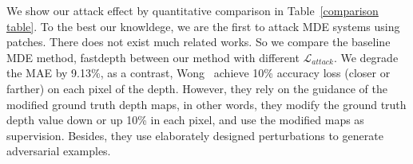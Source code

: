 \documentclass[10pt,twocolumn,letterpaper]{article}
\begin{document}
We show our attack effect by quantitative comparison in 
Table~\ref{comparison table}. To the best our knowldege,
we are the first to attack MDE systems using patches.
There does not exist much related works.
So we compare the baseline MDE method, fastdepth between
our method with different $\mathcal{L}_{attack}$.
We degrade the MAE by 9.13\%, as a contrast, 
Wong~\cite{Wong_2020_NIPS} achieve 10\% accuracy loss
(closer or farther)
on each pixel of the depth.
However, they rely on the guidance of the modified ground
truth depth maps, in other words, they modify the ground
truth depth value down or up 10\% in each pixel, 
and use the modified
maps as supervision. Besides, they use elaborately designed
perturbations to generate adversarial examples.


%
%		
\end{document}
